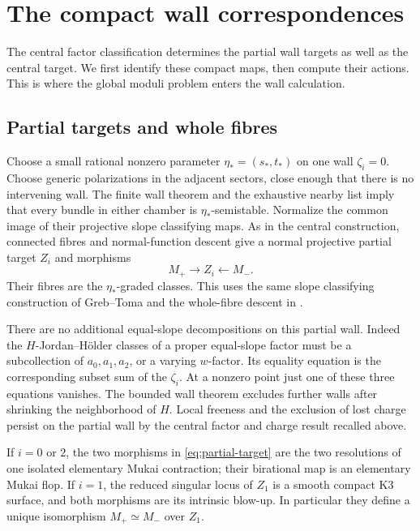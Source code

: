 \section{The compact wall correspondences}\label{sec:walls}

The central factor classification determines the partial wall
targets as well as the central target. We first identify these compact
maps, then compute their actions. This is where the global moduli
problem enters the wall calculation.

\subsection{Partial targets and whole fibres}
Choose a small rational nonzero parameter $\eta_*=(s_*,t_*)$ on
one wall $\zeta_i=0$. Choose generic polarizations in the adjacent
sectors, close enough that there is no intervening wall. The finite
wall theorem and the exhaustive nearby list imply that every bundle
in either chamber is $\eta_*$-semistable. Normalize the common
image of their projective slope classifying maps. As in the central
construction, connected fibres and normal-function descent give a
normal projective partial target $Z_i$ and morphisms
\begin{equation}\label{eq:partial-target}
 M_+\longrightarrow Z_i\longleftarrow M_-.
\end{equation}
Their fibres are the $\eta_*$-graded classes. This uses the same
slope classifying construction of Greb--Toma \cite{gt} and the
whole-fibre descent in \cite[\S4.5]{wuebben17}.

There are no additional equal-slope decompositions on this partial
wall. Indeed the $H$-Jordan--H\"older classes of a proper equal-slope
factor must be a subcollection of $a_0,a_1,a_2$, or a varying
$w$-factor. Its equality equation is the corresponding subset sum
of the $\zeta_i$. At a nonzero point just one of these three
equations vanishes. The bounded wall theorem excludes further walls
after shrinking the neighborhood of $H$. Local freeness and the
exclusion of lost charge persist on the partial wall by the
central factor and charge result recalled above.

\begin{proposition}\label{prop:compact-walls}
If $i=0$ or $2$, the two morphisms in \eqref{eq:partial-target}
are the two resolutions of one isolated elementary Mukai contraction;
their birational map is an elementary Mukai flop. If $i=1$, the
reduced singular locus of $Z_1$ is a smooth compact K3 surface, and
both morphisms are its intrinsic blow-up. In particular they define
a unique isomorphism $M_+\simeq M_-$ over $Z_1$.
\end{proposition}

